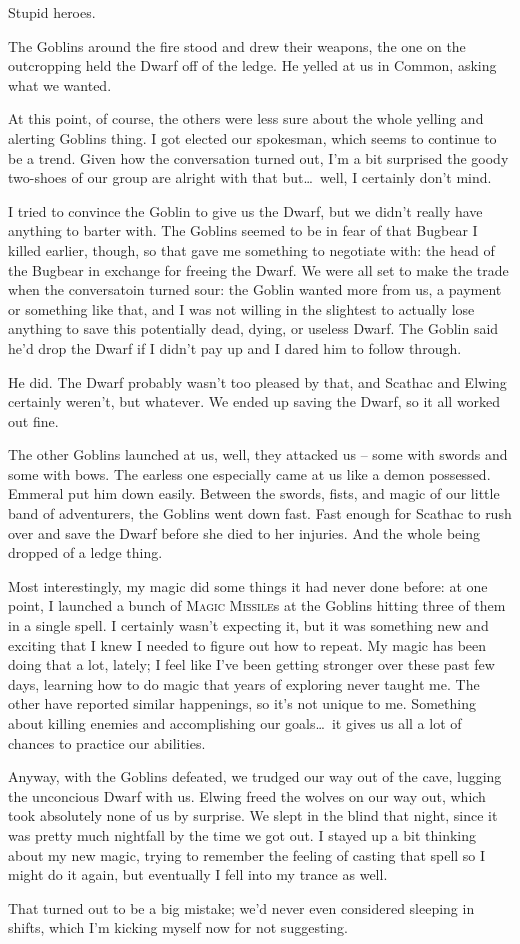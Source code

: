 Stupid heroes.

The Goblins around the fire stood and drew their weapons, the one on the outcropping held the Dwarf off of the ledge. He yelled at us in Common, asking what we wanted.

At this point, of course, the others were less sure about the whole yelling and alerting Goblins thing. I got elected our spokesman, which seems to continue to be a trend. Given how the conversation turned out, I'm a bit surprised the goody two-shoes of our group are alright with that but\dots\ well, I certainly don't mind.

I tried to convince the Goblin to give us the Dwarf, but we didn't really have anything to barter with. The Goblins seemed to be in fear of that Bugbear I killed earlier, though, so that gave me something to negotiate with: the head of the Bugbear in exchange for freeing the Dwarf. We were all set to make the trade when the conversatoin turned sour: the Goblin wanted more from us, a payment or something like that, and I was not willing in the slightest to actually lose anything to save this potentially dead, dying, or useless Dwarf. The Goblin said he'd drop the Dwarf if I didn't pay up and I dared him to follow through.

He did. The Dwarf probably wasn't too pleased by that, and Scathac and Elwing certainly weren't, but whatever. We ended up saving the Dwarf, so it all worked out fine.

The other Goblins launched at us, well, they attacked us -- some with swords and some with bows. The earless one especially came at us like a demon possessed. Emmeral put him down easily. Between the swords, fists, and magic of our little band of adventurers, the Goblins went down fast. Fast enough for Scathac to rush over and save the Dwarf before she died to her injuries. And the whole being dropped of a ledge thing.

Most interestingly, my magic did some things it had never done before: at one point, I launched a bunch of \textsc{Magic Missile}s at the Goblins hitting three of them in a single spell. I certainly wasn't expecting it, but it was something new and exciting that I knew I needed to figure out how to repeat. My magic has been doing that a lot, lately; I feel like I've been getting stronger over these past few days, learning how to do magic that years of exploring never taught me. The other have reported similar happenings, so it's not unique to me. Something about killing enemies and accomplishing our goals\dots\ it gives us all a lot of chances to practice our abilities.

Anyway, with the Goblins defeated, we trudged our way out of the cave, lugging the unconcious Dwarf with us. Elwing freed the wolves on our way out, which took absolutely none of us by surprise. We slept in the blind that night, since it was pretty much nightfall by the time we got out. I stayed up a bit thinking about my new magic, trying to remember the feeling of casting that spell so I might do it again, but eventually I fell into my trance as well.

That turned out to be a big mistake; we'd never even considered sleeping in shifts, which I'm kicking myself now for not suggesting.

\sleep
